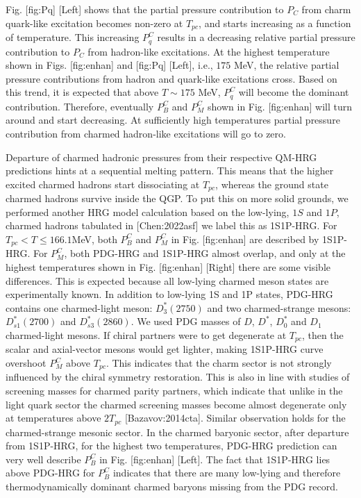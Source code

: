 \documentclass[11pt,a4paper]{article}
\begin{document}
Fig. [fig:Pq] [Left] shows that the partial pressure contribution to $P_C$ from charm quark-like excitation becomes non-zero at $T_{pc}$, and starts increasing as a function of temperature. This increasing $P^C_q$ results in a decreasing relative partial pressure contribution to $P_C$ from hadron-like excitations. At the highest temperature shown in Figs. [fig:enhan] and [fig:Pq] [Left], i.e., $175$ MeV, the relative partial pressure contributions from hadron and quark-like excitations cross. Based on this trend, it is expected that above $T\sim175$ MeV, $P^C_q$ will become the dominant contribution. Therefore, eventually $P^C_B$ and $P^C_M$ shown in Fig. [fig:enhan] will turn around and start decreasing. At sufficiently high  temperatures partial pressure contribution from charmed hadron-like excitations will go to zero.

Departure of charmed hadronic pressures from their respective QM-HRG predictions hints at a sequential melting pattern. This means that the higher excited charmed hadrons start dissociating at $T_{pc}$, whereas the ground state charmed hadrons survive inside the QGP. To put this on more solid grounds, we performed another HRG model calculation based on the low-lying, $1S$ and $1P$, charmed hadrons tabulated in [Chen:2022asf]  we label this as 1S1P-HRG. For $T_{pc}<T\leq 166.1$MeV, both $P^C_B$ and $P^C_M$ in Fig. [fig:enhan] are described by 1S1P-HRG. For $P^C_M$, both PDG-HRG and 1S1P-HRG almost overlap, and only at the highest temperatures shown in Fig. [fig:enhan] [Right] there are some visible differences. This is expected because all low-lying charmed meson states are experimentally known. In addition to low-lying 1S and 1P states, PDG-HRG contains one charmed-light meson: $D_3^*(2750)$ and two charmed-strange mesons: $D_{s1}^*(2700)$ and $D_{s3}^*(2860)$. We used PDG masses of $D$, $D^*$, $D^*_0$ and $D_1$ charmed-light mesons. If chiral partners were to get degenerate at $T_{pc}$, then the scalar and axial-vector mesons would get lighter, making 1S1P-HRG curve overshoot $P^C_M$ above $T_{pc}$. This indicates that the charm sector is not strongly influenced by the chiral symmetry restoration. This is also in line with studies of screening masses for charmed parity partners, which indicate that unlike in the light quark sector the charmed screening masses  become almost degenerate only at temperatures above $2T_{pc}$ [Bazavov:2014cta]. Similar observation holds for the charmed-strange mesonic sector. In the charmed baryonic sector, after departure from 1S1P-HRG, for the highest two temperatures, PDG-HRG prediction can very well describe $P^C_B$ in Fig. [fig:enhan] [Left]. The fact that 1S1P-HRG lies above PDG-HRG for $P^C_B$ indicates that there are many low-lying and therefore thermodynamically dominant charmed baryons missing from the PDG record.
\end{document}

